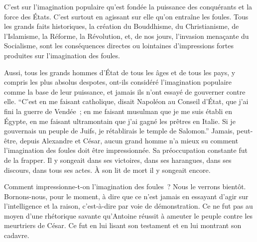 \documentclass[french,twoside]{book} %
\begin{document}
C’est sur l’imagination populaire qu’est fondée la puissance des conquérants et la force des États. C’est surtout en agissant sur elle qu’on entraîne les foules. Tous les grands faits historiques, la création du Bouddhisme, du Christianisme, de l’Islamisme, la Réforme, la Révolution, et, de nos jours, l’invasion menaçante du Socialisme, sont les conséquences directes ou lointaines d’impressions fortes produites sur l’imagina­tion des foules.\par
Aussi, tous les grands hommes d’État de tous les âges et de tous les pays, y compris les plus absolus despotes, ont-ils considéré l’imagination populaire comme la base de leur puissance, et jamais ils n’ont essayé de gouverner contre elle. “C’est en me faisant catholique, disait Napoléon au Conseil d’État, que j’ai fini la guerre de Vendée ; en me faisant musulman que je me suis établi en Égypte, en me faisant ultramontain que j’ai gagné les prêtres en Italie. Si je gouvernais un peuple de Juifs, je rétablirais le temple de Salomon.” Jamais, peut-être, depuis Alexandre et César, aucun grand homme n’a mieux su comment l’imagination des foules doit être impres­sionnée. Sa préoccupation constante fut de la frapper. Il y songeait dans ses victoires, dans ses harangues, dans ses discours, dans tous ses actes. À son lit de mort il y songeait encore.\par
Comment impressionne-t-on l’imagination des foules ? Nous le verrons bientôt. Bornons-nous, pour le moment, à dire que ce n’est jamais en essayant d’agir sur l’intelligence et la raison, c’est-à-dire par voie de démonstration. Ce ne fut pas au moyen d’une rhétorique savante qu’Antoine réussit à ameuter le peuple contre les meurtriers de César. Ce fut en lui lisant son testament et en lui montrant son cadavre.\par
\end{document}
